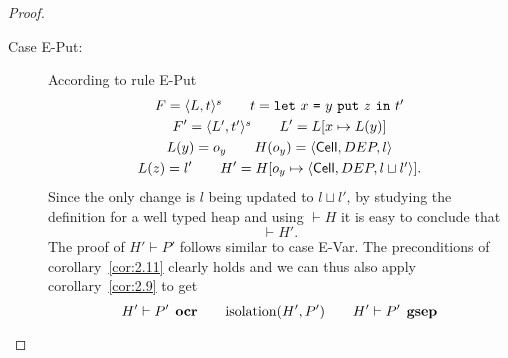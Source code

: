 \begin{proof}
\begin{description}
\begin{description}
\begin{description}
            \item[Case {\sc E-Put}:] According to rule {\sc E-Put}
              \begin{equation}
                \begin{gathered}
                  F = \mbox{$\langle L, t \rangle^s$} \quad\quad t = \mbox{\mdseries\texttt{let}~$x$~\texttt{=}~$\mbox{\mdseries$y$~\texttt{put}~$z$}$~\texttt{in}~$t'$} \\
                  F' = \mbox{$\langle L', t' \rangle^s$} \quad\quad L' = L[x \mapsto L(y)] \\
                  L(y) = o_y \quad\quad H(o_y) = \mbox{$\langle \mbox{$\mathsf{Cell}$}{}, DEP, l \rangle$} \\
                  L(z) = l' \quad\quad H' = H[o_y \mapsto \mbox{$\langle \mbox{$\mathsf{Cell}$}{}, DEP, l \sqcup
                  l' \rangle$}].
                \end{gathered}
              \end{equation}
              Since the only change is $l$ being updated to $l \sqcup l'$, by
              studying the definition for a well typed heap and using $\vdash H$
              it is easy to conclude that
              \begin{equation}
                \vdash H'.
              \end{equation}
              The proof of $H' \vdash P'$ follows similar to case {\sc E-Var}.
              The preconditions of corollary~\ref{cor:2.11} clearly holds and we
              can thus also apply corollary~\ref{cor:2.9} to get
              \begin{equation}
                H' \vdash P' \:\: \mbox{\bf ocr} \quad\quad \mbox{$\mathrm{isolation}$}(H', P') \quad\quad H'
                \vdash P' \:\: \mbox{\bf gsep}
              \end{equation}


\end{description}
\end{description}
\end{description}
\end{proof}
